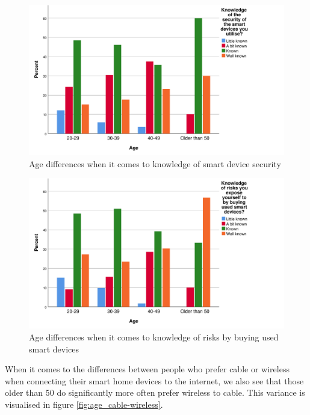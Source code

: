 \begin{figure}[!h]
    \centering
    \includegraphics[scale=0.55]{figures/diagrams/age_knowledge-security.pdf}
    \caption{Age differences when it comes to knowledge of smart device security}
    \label{fig:age_knowledge-security}
\end{figure}

\begin{figure}[!h]
    \centering
    \includegraphics[scale=0.55]{figures/diagrams/age_knowledge-risk.pdf}
    \caption{Age differences when it comes to knowledge of risks by buying used smart devices}
    \label{fig:age_knowledge-risk}
\end{figure}

When it comes to the differences between people who prefer cable or wireless when connecting their smart home devices to the internet, we also see that those older than 50 do significantly more often prefer wireless to cable. This variance is visualised in figure \ref{fig:age_cable-wireless}. 

